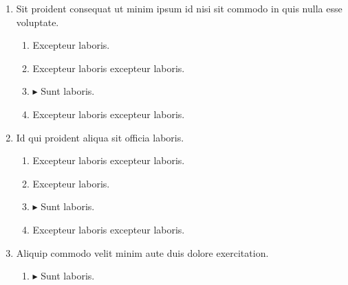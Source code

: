 \documentclass[a4paper,12pt]{article}
\begin{document}
\begin{enumerate}[label=\textbf{\arabic*.}]
\begin{multicols}{2}
\begin{enumerate}
		\item  Excepteur laboris excepteur laboris.
    
		\item  Excepteur laboris.
    
		\item $\blacktriangleright$  Sunt laboris.
    
	\end{enumerate}

\end{multicols}
\item Sit proident consequat ut minim ipsum id nisi sit commodo in quis nulla esse voluptate.
\begin{multicols}{2}
	\begin{enumerate}
		\item  Excepteur laboris.
    
		\item  Excepteur laboris excepteur laboris.
  
		\item $\blacktriangleright$  Sunt laboris.
    
		\item  Excepteur laboris excepteur laboris.
    
	\end{enumerate}

\end{multicols}
\item Id qui proident aliqua sit officia laboris.
\begin{multicols}{2}
	\begin{enumerate}
		\item  Excepteur laboris excepteur laboris.
  
		\item  Excepteur laboris.
    
		\item $\blacktriangleright$  Sunt laboris.
    
		\item  Excepteur laboris excepteur laboris.
    
	\end{enumerate}

\end{multicols}
\item Aliquip commodo velit minim aute duis dolore exercitation.
\begin{multicols}{2}
	\begin{enumerate}
		\item $\blacktriangleright$  Sunt laboris.
    

\end{enumerate}
\end{multicols}
\end{enumerate}
\end{document}
